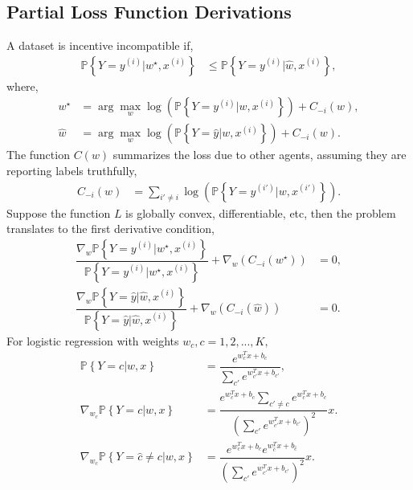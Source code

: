 \documentclass{article}
\begin{document}
\subsection{Partial Loss Function Derivations}
A dataset is incentive incompatible if,
\begin{align*}
\mathbb{P}\left\{Y = y^{\left(i\right)} | w^\star , x^{\left(i\right)}\right\} &\leq  \mathbb{P}\left\{Y = y^{\left(i\right)} | \hat{w}, x^{\left(i\right)}\right\},
\end{align*}
where,
\begin{align*}
w^\star  &= \arg\displaystyle\max_{w} \log\left(\mathbb{P}\left\{Y = y^{\left(i\right)} | w, x^{\left(i\right)}\right\}\right) + C_{-i}\left(w\right),
\\ \hat{w} &= \arg\displaystyle\max_{w} \log\left(\mathbb{P}\left\{Y = \hat{y} | w, x^{\left(i\right)}\right\}\right) + C_{-i}\left(w\right).
\end{align*}
The function $C\left(w\right) $ summarizes the loss due to other agents, assuming they are reporting labels truthfully,
\begin{align*}
C_{-i}\left(w\right) &= \displaystyle\sum_{i' \neq  i} \log\left(\mathbb{P}\left\{Y = y^{\left(i'\right)} | w, x^{\left(i'\right)}\right\}\right).
\end{align*}
Suppose the function $L $ is globally convex, differentiable, etc, then the problem translates to the first derivative condition,
\begin{align*}
\dfrac{\nabla _{w} \mathbb{P}\left\{Y = y^{\left(i\right)} | w^\star , x^{\left(i\right)}\right\}}{\mathbb{P}\left\{Y = y^{\left(i\right)} | w^\star , x^{\left(i\right)}\right\}} + \nabla _{w} \left(C_{-i}\left(w^\star \right)\right) &= 0,
\\ \dfrac{\nabla _{w} \mathbb{P}\left\{Y = \hat{y} | \hat{w}, x^{\left(i\right)}\right\}}{\mathbb{P}\left\{Y = \hat{y} | \hat{w}, x^{\left(i\right)}\right\}} + \nabla _{w} \left(C_{-i}\left(\hat{w}\right)\right) &= 0.
\end{align*}
For logistic regression with weights $w_{c}, c = 1, 2, ..., K, $
\begin{align*}
\mathbb{P}\left\{Y = c | w, x\right\} &= \dfrac{e^{w_{c}^{T} x + b_{c}}}{\displaystyle\sum_{c'} e^{w_{c'}^{T} x + b_{c'}}},
\\ \nabla _{w_{c}} \mathbb{P}\left\{Y = c | w, x\right\} &= \dfrac{e^{w_{c}^{T} x + b_{c}} \displaystyle\sum_{c' \neq  c} e^{w_{c}^{T} x + b_{c}}}{\left(\displaystyle\sum_{c'} e^{w_{c'}^{T} x + b_{c'}}\right)^{2}} x.
\\ \nabla _{w_{c}} \mathbb{P}\left\{Y = \hat{c} \neq  c | w, x\right\} &= \dfrac{e^{w_{c}^{T} x + b_{c}} e^{w_{\hat{c}}^{T} x + b_{\hat{c}}}}{\left(\displaystyle\sum_{c'} e^{w_{c'}^{T} x + b_{c'}}\right)^{2}} x.
\end{align*}
\end{document}
